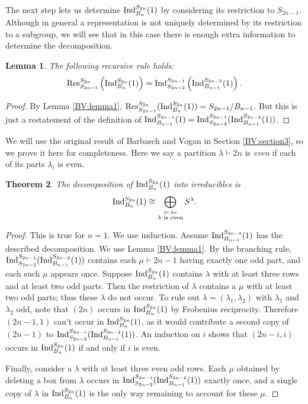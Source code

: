 \documentclass[12pt]{amsart}
\newtheorem{theorem}{Theorem}
\newtheorem{lemma}[theorem]{Lemma}
\numberwithin{theorem}{section}
\newcommand{\Ind}{\textup{Ind}}
\newcommand{\Res}{\textup{Res}}
\begin{document}
The next step lets us determine $\Ind_{B_n}^{S_{2n}}(1)$ by considering its restriction to $S_{2n-1}$.
Although in general a representation is not uniquely determined by its restriction to a subgroup, we will see that in this case there is enough extra information to determine the decomposition.

\begin{lemma}\label{BV:lemma2}
The following recursive rule holds:
$$\Res_{S_{2n-1}}^{S_{2n}}\left(\Ind_{B_n}^{S_{2n}}(1)\right) = \Ind_{S_{2n-2}}^{S_{2n-1}}\left(\Ind_{B_{n-1}}^{S_{2n-2}}(1)\right).$$
\end{lemma}
\begin{proof}
By Lemma \ref{BV:lemma1}, $\Res_{S_{2n-1}}^{S_{2n}}(\Ind_{B_n}^{S_{2n}}(1)) = S_{2n-1}/B_{n-1}$.
But this is just a restatement
of the definition of $ \Ind_{B_{n-1}}^{S_{2n-1}} (1) = \Ind_{S_{2n-2}}^{S_{2n-1}}(\Ind_{B_{n-1}}^{S_{2n-2}}(1))$.
\end{proof}

We will use the original result of Barbasch and Vogan in Section \ref{BV:section3}, so we prove it here for completeness.
Here we say a partition $\lambda \vdash 2n$ is {\em even} if each of its parts $\lambda_i$ is even.

\begin{theorem}\label{BV:theorem1}
The decomposition of $\Ind_{B_n}^{S_{2n}}(1)$ into irreducibles is 
$$\Ind_{B_n}^{S_{2n}}(1) \cong \bigoplus_{\stackrel{\lambda \vdash 2n}{\lambda  \textup{ is even}}} S^\lambda.$$
\end{theorem}
\begin{proof}
This is true for $n=1$.
We use induction.
Assume $\Ind_{B_{n-1}}^{S_{2n-2}}(1)$ has the described decomposition.
We use Lemma \ref{BV:lemma1}.
By the branching rule, $\Ind^{S_{2n-1}}_{S_{2n-2}}(\Ind_{B_{n-1}}^{S_{2n-2}}(1))$ contains each $\mu \vdash 2n-1$ having exactly one odd part, and each such $\mu$ appears once.
Suppose $\Ind_{B_n}^{S_{2n}}(1)$ contains $\lambda$ with at least three rows and at least two odd parts.
Then the restriction of $\lambda$ contains a $\mu$ with at least two odd parts; thus these $\lambda$ do not occur.
To rule out $\lambda=(\lambda_1,\lambda_2)$ with $\lambda_1$ and $\lambda_2$ odd, note that $(2n)$ occurs in $\Ind_{B_n}^{S_{2n}}(1)$ by Frobenius reciprocity.
Therefore $(2n-1,1)$ can't occur in $\Ind_{B_n}^{S_{2n}}(1)$, as it would contribute a second copy of $(2n-1)$ to $\Ind^{S_{2n-1}}_{S_{2n-2}}(\Ind_{B_{n-1}}^{S_{2n-2}}(1))$.
An induction on $i$ shows that $(2n-i,i)$ occurs in $\Ind_{B_n}^{S_{2n}}(1)$ if and only if $i$ is even.

Finally, consider a $\lambda$ with at least three even odd rows.
Each $\mu$ obtained by deleting a box from $\lambda$ occurs in $\Ind^{S_{2n-1}}_{S_{2n-2}}(\Ind_{B_{n-1}}^{S_{2n-2}}(1))$ exactly once, and a single copy of $\lambda$ in $\Ind_{B_n}^{S_{2n}}(1)$ is the only way remaining to account for these $\mu$.
\end{proof}
\end{document}
